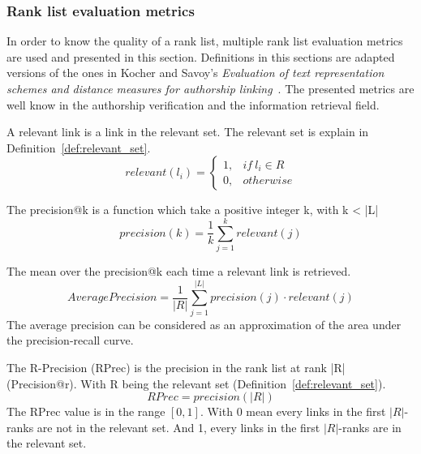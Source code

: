 \subsubsection{Rank list evaluation metrics}
\label{sec:rl_eval}

In order to know the quality of a rank list, multiple rank list evaluation metrics are used and presented in this section.
Definitions in this sections are adapted versions of the ones in Kocher and Savoy's \textit{Evaluation of text representation schemes and distance measures for authorship linking}~\cite{kocher_linking}.
The presented metrics are well know in the authorship verification and the information retrieval field.

\begin{definition}
  A relevant link is a link in the relevant set.
  The relevant set is explain in Definition~\ref{def:relevant_set}.
  \begin{equation}
    relevant(l_i) =
    \begin{cases}
      1, & if\ l_i \in R \\
      0, & otherwise
    \end{cases}
  \end{equation}
\end{definition}

\begin{definition}
  The precision@k is a function which take a positive integer k, with k < |L|
  \begin{equation}
    precision(k) = \frac{1}{k} \sum_{j=1}^{k} relevant(j)
  \end{equation}
\end{definition}

\begin{definition}
  The mean over the precision@k each time a relevant link is retrieved.
  \begin{equation}
    AveragePrecision = \frac{1}{|R|} \sum_{j=1}^{|L|} precision(j) \cdot relevant(j)
  \end{equation}
  The average precision can be considered as an approximation of the area under the precision-recall curve.
\end{definition}

\begin{definition}
  The R-Precision (RPrec) is the precision in the rank list at rank |R| (Precision@r).
  With R being the relevant set (Definition~\ref{def:relevant_set}).
  \begin{equation}
    RPrec = precision(|R|)
  \end{equation}
  The RPrec value is in the range $\left[0, 1\right]$.
  With 0 mean every links in the first $|R|$-ranks are not in the relevant set.
  And 1, every links in the first $|R|$-ranks are in the relevant set.
\end{definition}


